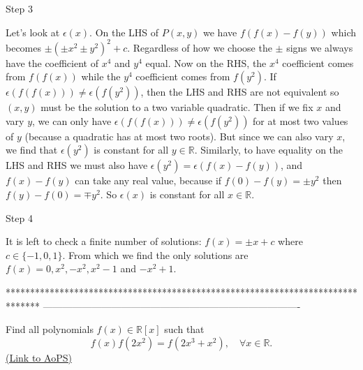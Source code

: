 \begin{solution}
\begin{bolded}Step 3\end{bolded} 
Let's look at $\epsilon(x)$. On the LHS of $P(x,y)$ we have $f(f(x)-f(y))$ which becomes $\pm (\pm x^2 \pm y^2)^2 +c$. Regardless of how we choose the $\pm$ signs we always have the coefficient of $x^4$ and $y^4$ equal. Now on the RHS, the $x^4$ coefficient comes from $f(f(x))$ while the $y^4$ coefficient comes from $f(y^2)$. If $\epsilon(f(f(x)))\neq \epsilon (f(y^2))$, then the LHS and RHS are not equivalent so $(x,y)$ must be the solution to a two variable quadratic. Then if we fix $x$ and vary $y$, we can only have $\epsilon(f(f(x)))\neq \epsilon (f(y^2))$ for at most two values of $y$ (because a quadratic has at most two roots). But since we can also vary $x$, we find that $\epsilon(y^2)$ is constant for all $y\in \mathbb{R}$. Similarly, to have equality on the LHS and RHS we must also have $\epsilon(y^2) = \epsilon(f(x)-f(y))$, and $f(x)-f(y)$ can take any real value, because if $f(0)-f(y)=\pm y^2$ then $f(y)-f(0)=\mp y^2$. So $\epsilon(x)$ is constant for all $x\in \mathbb{R}$.

\begin{bolded}Step 4\end{bolded}
It is left to check a finite number of solutions: $f(x)=\pm x + c$ where $c\in \{-1,0,1\}$. From which we find the only solutions are $f(x)=0,x^2,-x^2,x^2-1$ and $-x^2+1$.
\end{solution}
*******************************************************************************
-------------------------------------------------------------------------------

\begin{problem}
	Find all polynomials $f(x) \in \mathbb{R}[x] $ such that 
\[f(x)f(2x^2)=f(2x^3+x^2), \quad \forall  x\in \mathbb{R}.\]
	\flushright \href{https://artofproblemsolving.com/community/c6h391333}{(Link to AoPS)}
\end{problem}



